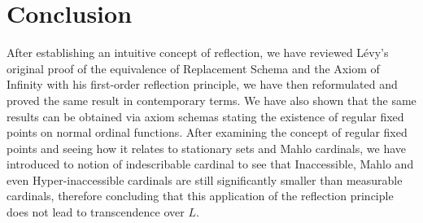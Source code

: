 \documentclass[12pt,a4paper]{article}
\begin{document}
\newpage
\section{Conclusion}
After establishing an intuitive concept of reflection, we have reviewed Lévy's original proof of the equivalence of Replacement Schema and the Axiom of Infinity with his first-order reflection principle, we have then reformulated and proved the same result in contemporary terms. We have also shown that the same results can be obtained via axiom schemas stating the existence of regular fixed points on normal ordinal functions. After examining the concept of regular fixed points and seeing how it relates to stationary sets and Mahlo cardinals, we have introduced to notion of indescribable cardinal to see that Inaccessible, Mahlo and even Hyper-inaccessible cardinals are still significantly smaller than measurable cardinals, therefore concluding that this application of the reflection principle does not lead to transcendence over $L$.

\newpage


\end{document}
